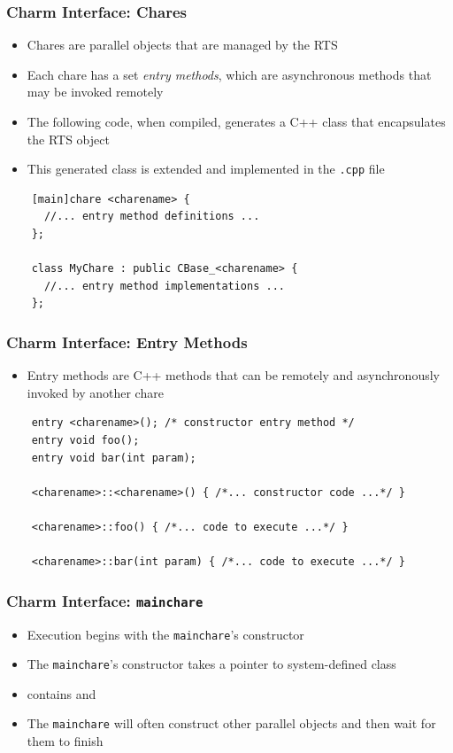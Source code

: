 \begin{frame}[fragile]
  \frametitle{Charm Interface: Chares}
  \begin{itemize}
    \item Chares are parallel objects that are managed by the RTS
    \item Each chare has a set \textit{entry methods}, which are asynchronous
      methods that may be invoked remotely
    \item The following code, when compiled, generates a C++ class
       that encapsulates the RTS object
    \item This generated class is extended and implemented in the \texttt{.cpp}
      file
  \end{itemize}
  \begin{lstlisting}
    [main]chare <charename> {
      //... entry method definitions ...
    };

    class MyChare : public CBase_<charename> {
      //... entry method implementations ...
    };
  \end{lstlisting}
\end{frame}

\begin{frame}[fragile]
  \frametitle{Charm Interface: Entry Methods}
  \begin{itemize}
  \item Entry methods are C++ methods that can be remotely and asynchronously
    invoked by another chare
  \end{itemize}
  \begin{lstlisting}
    entry <charename>(); /* constructor entry method */
    entry void foo();
    entry void bar(int param);

    <charename>::<charename>() { /*... constructor code ...*/ }

    <charename>::foo() { /*... code to execute ...*/ }

    <charename>::bar(int param) { /*... code to execute ...*/ }
  \end{lstlisting}
\end{frame}

\begin{frame}[fragile]
   \frametitle{Charm Interface: \texttt{mainchare}}
   \begin{itemize}
     \item Execution begins with the \texttt{mainchare}'s constructor
     \item The \texttt{mainchare}'s constructor takes a pointer to
       system-defined class 
     \item {} contains  and 
     \item The \texttt{mainchare} will often construct other parallel objects
       and then wait for them to finish
   \end{itemize}
\end{frame}

